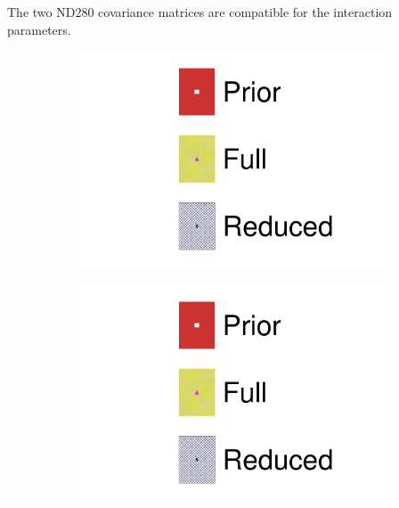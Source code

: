The two ND280 covariance matrices are compatible for the interaction parameters.
\begin{figure}[h]
	\centering
	\begin{subfigure}[t]{0.1\textwidth}
		\includegraphics[width=\textwidth,page=1, trim={0mm 135mm 30mm 0mm}, clip]{figures/mach3/2018/asimov/2018a_FixedCov_FullCov_Mpi_Asimov_merg_2018a_FixedCov_RedCov_Mpi_Asimov_merge}
	\end{subfigure}
	\begin{subfigure}[t]{0.1\textwidth}
		\includegraphics[width=\textwidth,page=1, trim={0mm 70mm 30mm 60mm}, clip]{figures/mach3/2018/asimov/2018a_FixedCov_FullCov_Mpi_Asimov_merg_2018a_FixedCov_RedCov_Mpi_Asimov_merge}
	\end{subfigure}
	\begin{subfigure}[t]{0.1\textwidth}

\end{subfigure}
\end{figure}
